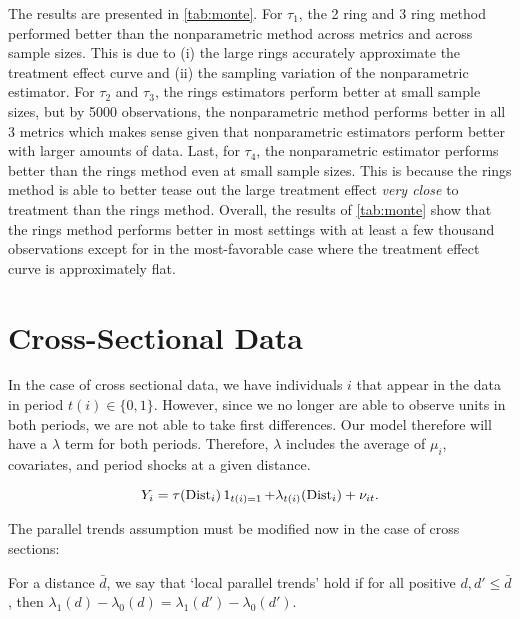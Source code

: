 The results are presented in \autoref{tab:monte}. For $\tau_1$, the 2 ring and 3 ring method performed better than the nonparametric method across metrics and across sample sizes. This is due to (i) the large rings accurately approximate the treatment effect curve and (ii) the sampling variation of the nonparametric estimator. For $\tau_2$ and $\tau_3$, the rings estimators perform better at small sample sizes, but by 5000 observations, the nonparametric method performs better in all 3 metrics which makes sense given that nonparametric estimators perform better with larger amounts of data. Last, for $\tau_4$, the nonparametric estimator performs better than the rings method even at small sample sizes. This is because the rings method is able to better tease out the large treatment effect \textit{very close} to treatment than the rings method. Overall, the results of \autoref{tab:monte} show that the rings method performs better in most settings with at least a few thousand observations except for in the most-favorable case where the treatment effect curve is approximately flat.



\section{Cross-Sectional Data}

In the case of cross sectional data, we have individuals $i$ that appear in the data in period $t(i) \in \{0,1\}$. However, since we no longer are able to observe units in both periods, we are not able to take first differences. Our model therefore will have a $\lambda$ term for both periods. Therefore, $\lambda$ includes the average of $\mu_i$, covariates, and period shocks at a given distance.

\begin{equation}\label{eq:model_rc}
  Y_{i} = \tau(\dist_i) \one_{t(i) = 1} + \lambda_{t(i)}(\dist_i) + \nu_{it}.  
\end{equation}

The parallel trends assumption must be modified now in the case of cross sections:

\begin{assumption}\label{assum:parallel_rc}
  For a distance $\bar{d}$, we say that `local parallel trends' hold if for all positive $d, d' \leq \bar{d}$, then $\lambda_1(d) - \lambda_0(d) = \lambda_1(d') - \lambda_0(d')$.
\end{assumption}

